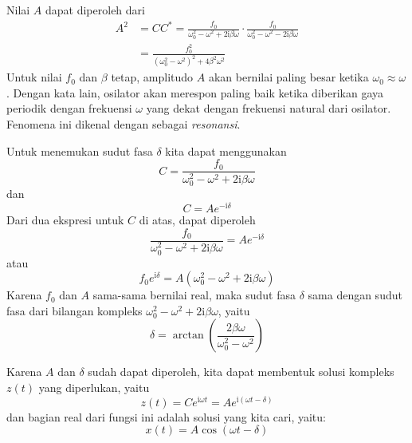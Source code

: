 Nilai $A$ dapat diperoleh dari
\begin{align*}
A^{2} & = CC^{*} =
\frac{f_{0}}{\omega_{0}^{2} - \omega^{2} + 2\mathrm{i}\beta\omega} \cdot 
\frac{f_{0}}{\omega_{0}^{2} - \omega^{2} - 2\mathrm{i}\beta\omega} \\
 & = \frac{f_{0}^{2}}{\left(\omega_{0}^{2} - \omega^{2}\right)^{2} + 4\beta^{2}\omega^{2}}
\end{align*}
Untuk nilai $f_0$ dan $\beta$ tetap, amplitudo $A$ akan
bernilai paling besar ketika $\omega_{0} \approx \omega$.
Dengan kata lain, osilator
akan merespon paling baik ketika diberikan gaya periodik dengan
frekuensi $\omega$ yang dekat dengan frekuensi natural dari osilator.
Fenomena ini dikenal dengan sebagai \emph{resonansi}.

Untuk menemukan sudut fasa $\delta$ kita dapat menggunakan
\begin{equation*}
C = \frac{f_{0}}{\omega_{0}^{2}-\omega^{2}+2\mathrm{i}\beta\omega}
\end{equation*}
dan
\begin{equation*}
C = Ae^{-\mathrm{i}\delta}
\end{equation*}
Dari dua ekspresi untuk $C$ di atas, dapat diperoleh
\begin{equation*}
\frac{f_{0}}{\omega_{0}^{2} - \omega^{2} + 2\mathrm{i}\beta\omega} = A e^{-\mathrm{i}\delta}
\end{equation*}
atau
\begin{equation*}
f_{0}e^{\mathrm{i}\delta} = A\left(\omega_{0}^{2} - \omega^{2} + 2\mathrm{i}\beta\omega\right)
\end{equation*}
Karena $f_{0}$ dan $A$ sama-sama bernilai real, maka sudut fasa
$\delta$ sama dengan sudut fasa dari bilangan kompleks $\omega_{0}^{2}-\omega^{2} + 2\mathrm{i}\beta\omega$,
yaitu
\begin{equation*}
\delta=\arctan\left(\frac{2\beta\omega}{\omega_{0}^{2}-\omega^{2}}\right)
\end{equation*}

Karena $A$ dan $\delta$ sudah dapat diperoleh, kita dapat membentuk solusi kompleks
$z(t)$ yang diperlukan, yaitu
\begin{equation}
z(t) = Ce^{\mathrm{i}\omega t} = A e^{\mathrm{i}(\omega t-\delta)}
\end{equation}
dan bagian real dari fungsi ini adalah solusi yang kita cari, yaitu:
\begin{equation}
x(t) = A\cos(\omega t - \delta)
\end{equation}


